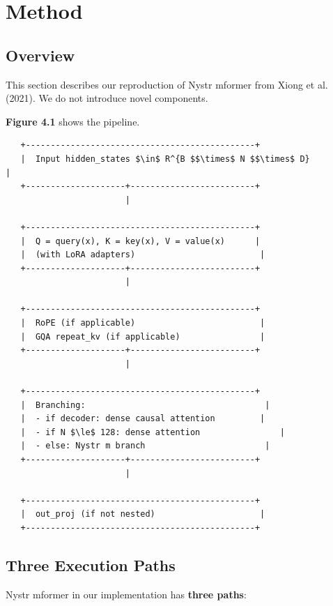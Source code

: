 
\section{Method}

\subsection{Overview}

This section describes our reproduction of Nystr mformer from Xiong et al. 
(2021). We do not introduce novel components.

\textbf{Figure 4.1} shows the pipeline.

\begin{lstlisting}
   +----------------------------------------------+
   |  Input hidden_states $\in$ R^{B $$\times$ N $$\times$ D}         |
   +--------------------+-------------------------+
                        |
                         
   +----------------------------------------------+
   |  Q = query(x), K = key(x), V = value(x)      |
   |  (with LoRA adapters)                         |
   +--------------------+-------------------------+
                        |
                         
   +----------------------------------------------+
   |  RoPE (if applicable)                         |
   |  GQA repeat_kv (if applicable)                |
   +--------------------+-------------------------+
                        |
                         
   +----------------------------------------------+
   |  Branching:                                    |
   |  - if decoder: dense causal attention         |
   |  - if N $\le$ 128: dense attention                |
   |  - else: Nystr m branch                        |
   +--------------------+-------------------------+
                        |
                         
   +----------------------------------------------+
   |  out_proj (if not nested)                     |
   +----------------------------------------------+
\end{lstlisting}

\subsection{Three Execution Paths}

Nystr mformer in our implementation has \textbf{three paths}:

